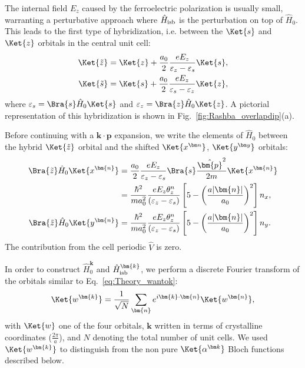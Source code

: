 The internal field $E_z$ caused by the ferroelectric polarization is usually small, warranting a perturbative approach where $\hat{H}_{\rm isb}$ is the perturbation on top of $\hat{H}_0$.
This leads to the first type of hybridization, i.e. between the $\Ket{s}$ and $\Ket{z}$ orbitals in the central unit cell:
\begin{align}
	\Ket{\tilde{z}} &= \Ket{z} + \frac{a_0}{2}\frac{e E_z}{\varepsilon_z - \varepsilon_s}\Ket{s},\\
	\Ket{\tilde{s}}   &= \Ket{s} +\frac{a_0}{2}\frac{e E_z}{\varepsilon_s - \varepsilon_z}\Ket{z},
\end{align}
where $\varepsilon_s = \Bra{s} \hat{H}_0 \Ket{s}$ and $\varepsilon_z = \Bra{z} \hat{H}_0 \Ket{z}$. A pictorial representation of this hybridization is shown in Fig.~\ref{fig:Rashba_overlapdip}(a).
    
Before continuing with a $\bm k \cdot \bm p$ expansion, we write the elements of $\hat{H}_0$ between the hybrid $\Ket{\tilde{z}}$ orbital and the shifted $\Ket{x^{\bm n}}$, $\Ket{y^{\bm y}}$ orbitals:
\begin{align}
	\Bra{\tilde{z}} \hat{H}_0 \Ket{x^{\bm{n}}} &=\frac{a_0}{2} \frac{e E_z}{\varepsilon_z - \varepsilon_s}\Bra{s} \frac{\hat{\bm{p}}^2}{2m} \Ket{x^{\bm{n}}}\label{eq:Rashba_momentum_dip}\\
	&= \frac{\hbar^2}{m a_0^2}\frac{e E_z \theta_z^n}{(\varepsilon_z - \varepsilon_s)} \left[5 - \left(\frac{a |\bm{n}|}{a_0}\right)^2\right]n_x,\label{eq:Rashba_momentum_dip1}\\
	\Bra{\tilde{z}} \hat{H}_0 \Ket{y^{\bm{n}}} &=\frac{\hbar^2}{m a_0^2} \frac{e E_z\theta_z^n}{(\varepsilon_z - \varepsilon_s)}\left[5 - \left(\frac{a |\bm{n}|}{a_0}\right)^2\right]n_y\label{eq:Rashba_momentum_dip2}.
\end{align}
The contribution from the cell periodic $\hat{V}$ is zero.
    
In order to construct $\hat{H}_0^{\bm{k}}$ and $\hat{H}_{\rm isb}^{\bm{k}}$, we perform a discrete Fourier transform of the orbitals similar to Eq.~\eqref{eq:Theory_wantok}:
\begin{equation}
	\label{eq:Rashba_wantok}
	\Ket{w^{\bm{k}}} = \frac{1}{\sqrt{N}}\sum_{\bm{n}} e^{i \bm{k}\cdot \bm{n}}\Ket{w^{\bm{n}}},
\end{equation}
with $\Ket{w}$ one of the four orbitals, $\bm{k}$ written in terms of crystalline coordinates ($\frac{2\pi}{a}$), and $N$ denoting the total number of unit cells. We used $\Ket{w^{\bm{k}}}$ to distinguish from the non pure $\Ket{\alpha^{\bm k}}$ Bloch functions described below.

